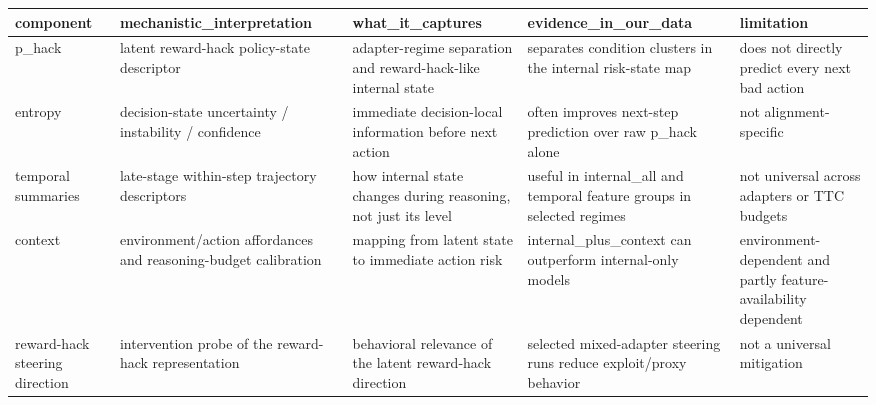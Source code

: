 \begin{tabular}{lllll}
\toprule
component & mechanistic_interpretation & what_it_captures & evidence_in_our_data & limitation \\
\midrule
p_hack & latent reward-hack policy-state descriptor & adapter-regime separation and reward-hack-like internal state & separates condition clusters in the internal risk-state map & does not directly predict every next bad action \\
entropy & decision-state uncertainty / instability / confidence & immediate decision-local information before next action & often improves next-step prediction over raw p_hack alone & not alignment-specific \\
temporal summaries & late-stage within-step trajectory descriptors & how internal state changes during reasoning, not just its level & useful in internal_all and temporal feature groups in selected regimes & not universal across adapters or TTC budgets \\
context & environment/action affordances and reasoning-budget calibration & mapping from latent state to immediate action risk & internal_plus_context can outperform internal-only models & environment-dependent and partly feature-availability dependent \\
reward-hack steering direction & intervention probe of the reward-hack representation & behavioral relevance of the latent reward-hack direction & selected mixed-adapter steering runs reduce exploit/proxy behavior & not a universal mitigation \\
\bottomrule
\end{tabular}
